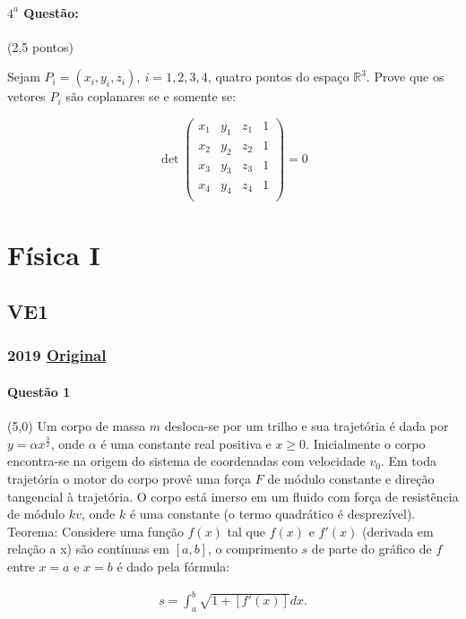 \documentclass[12pt,a4paper]{article}
\newcommand{\original}[1]{\tiny \href{#1}{Original} \normalsize}
\begin{document}
\paragraph{$4^a$ Questão:} (2,5 pontos)

Sejam $P_i=(x_i,y_i,z_i), \ i=1,2,3,4$, quatro pontos do espaço $\mathbb{R}^3$. Prove que os vetores $P_i$ são coplanares se e somente se:

$$ \det{
\left(
\begin{array}{cccc}
x_1 & y_1 & z_1 & 1 \\
x_2 & y_2 & z_2 & 1 \\
x_3 & y_3 & z_3 & 1 \\
x_4 & y_4 & z_4 & 1 \\
\end{array}
\right)
}=0 $$

\newpage
\section{Física I}

\subsection{VE1}

\subsubsection{2019 \original{}}

\paragraph{Questão 1} (5,0) Um corpo de massa $m$ desloca-se por um trilho e sua trajetória é dada por $y = \alpha x^{\frac{3}{2}}$, onde $\alpha$ é uma constante real positiva e $x \geq 0$. Inicialmente o corpo encontra-se na origem do sistema de coordenadas com velocidade $v_0$. Em toda trajetória o motor do corpo provê uma força $F$ de módulo constante e direção tangencial à trajetória. O corpo está imerso em um fluido com força de resistência de módulo $kv$, onde $k$ é uma constante (o termo quadrático é desprezível). \\
Teorema: Considere uma função $f(x)$ tal que $f(x)$ e $f'(x)$ (derivada em relação a x) são contínuas em $\left[a, b\right]$, o comprimento $s$ de parte do gráfico de $f$ entre $x = a$ e $x = b$ é dado pela fórmula:

\begin{center}
\begin{align*}
    s = \int_{a}^{b} \sqrt{1 + [f'(x)]}dx. \\
\end{align*}
\end{center}
\end{document}
